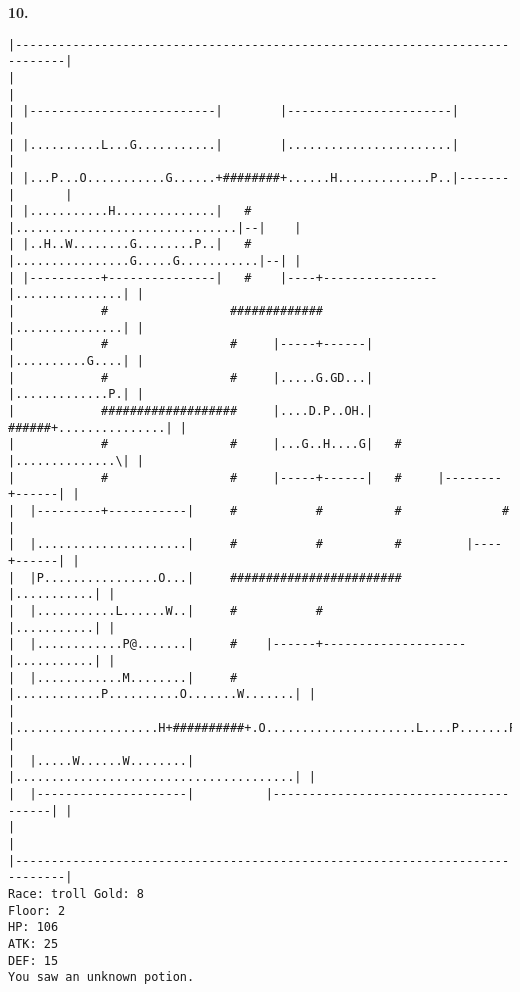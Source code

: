 \documentclass[11pt]{article}
\theoremstyle{plain}
\begin{document}
\newpage
\textbf{10. }
\begin{Verbatim}[fontsize=\scriptsize]
|-----------------------------------------------------------------------------|
|                                                                             |
| |--------------------------|        |-----------------------|               |
| |..........L...G...........|        |.......................|               |
| |...P...O...........G......+########+......H.............P..|-------|       |
| |...........H..............|   #    |...............................|--|    |
| |..H..W........G........P..|   #    |................G.....G...........|--| |
| |----------+---------------|   #    |----+----------------|...............| |
|            #                 #############                |...............| |
|            #                 #     |-----+------|         |..........G....| |
|            #                 #     |.....G.GD...|         |.............P.| |
|            ###################     |....D.P..OH.|   ######+...............| |
|            #                 #     |...G..H....G|   #     |..............\| |
|            #                 #     |-----+------|   #     |--------+------| |
|  |---------+-----------|     #           #          #              #        |
|  |.....................|     #           #          #         |----+------| |
|  |P................O...|     ########################         |...........| |
|  |...........L......W..|     #           #                    |...........| |
|  |............P@.......|     #    |------+--------------------|...........| |
|  |............M........|     #    |............P..........O.......W.......| |
|  |....................H+##########+.O.....................L....P.......P..| |
|  |.....W......W........|          |.......................................| |
|  |---------------------|          |---------------------------------------| |
|                                                                             |
|-----------------------------------------------------------------------------|
Race: troll Gold: 8                                                    Floor: 2
HP: 106
ATK: 25
DEF: 15
You saw an unknown potion. 
\end{Verbatim}
\end{document}
